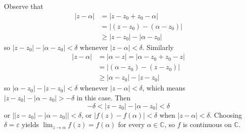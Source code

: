 \documentclass{article}
\begin{document}
\begin{Answer}
  Observe that
  \begin{align*}
          |z - \alpha|
    &=    |z - z_0 + z_0 - \alpha| \\
    &=    |(z - z_0) - (\alpha - z_0)| \\
    &\geq |z - z_0| - |\alpha - z_0|
  \end{align*}
  so $|z - z_0| - |\alpha - z_0| < \delta$ whenever $|z - \alpha| < \delta$.
  Similarly
  \begin{align*}
          |z - \alpha|
    &=    |\alpha - z|
     =    |\alpha - z_0 + z_0 - z| \\
    &=    |(\alpha - z_0) - (z - z_0)| \\
    &\geq |\alpha - z_0| - |z - z_0|
  \end{align*}
  so $|\alpha - z_0| - |z - z_0| < \delta$ whenever $|z - \alpha| < \delta$,
  which means $|z - z_0| - |\alpha - z_0| > -\delta$ in this case. Then
  $$
  -\delta < |z - z_0| - |\alpha - z_0| < \delta
  $$
  or $\left||z - z_0| - |\alpha - z_0|\right| < \delta$, or
  $|f(z) - f(\alpha)| < \delta$ when $|z - \alpha| < \delta$. Choosing
  $\delta = \varepsilon$ yields $\lim_{z \to \alpha} f(z) = f(\alpha)$ for
  every $\alpha \in \mathbb{C}$, so $f$ is continuous on $\mathbb{C}$.
\end{Answer}
\end{document}
